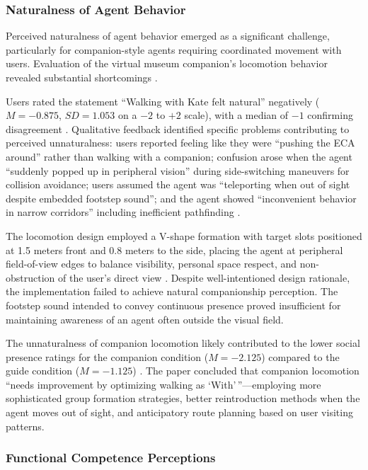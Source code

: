 \documentclass[manuscript,anonymous,sigconf]{acmart}
\begin{document}
\subsubsection{Naturalness of Agent Behavior}

Perceived naturalness of agent behavior emerged as a significant challenge, particularly for companion-style agents requiring coordinated movement with users. Evaluation of the virtual museum companion's locomotion behavior revealed substantial shortcomings \cite{A82}.

Users rated the statement ``Walking with Kate felt natural'' negatively ($M = -0.875$, $SD = 1.053$ on a $-2$ to $+2$ scale), with a median of $-1$ confirming disagreement \cite{A82}. Qualitative feedback identified specific problems contributing to perceived unnaturalness: users reported feeling like they were ``pushing the ECA around'' rather than walking with a companion; confusion arose when the agent ``suddenly popped up in peripheral vision'' during side-switching maneuvers for collision avoidance; users assumed the agent was ``teleporting when out of sight despite embedded footstep sound''; and the agent showed ``inconvenient behavior in narrow corridors'' including inefficient pathfinding \cite{A82}.

The locomotion design employed a V-shape formation with target slots positioned at 1.5 meters front and 0.8 meters to the side, placing the agent at peripheral field-of-view edges to balance visibility, personal space respect, and non-obstruction of the user's direct view \cite{A82}. Despite well-intentioned design rationale, the implementation failed to achieve natural companionship perception. The footstep sound intended to convey continuous presence proved insufficient for maintaining awareness of an agent often outside the visual field.

The unnaturalness of companion locomotion likely contributed to the lower social presence ratings for the companion condition ($M = -2.125$) compared to the guide condition ($M = -1.125$) \cite{A82}. The paper concluded that companion locomotion ``needs improvement by optimizing walking as `With'\,''---employing more sophisticated group formation strategies, better reintroduction methods when the agent moves out of sight, and anticipatory route planning based on user visiting patterns.

\subsubsection{Functional Competence Perceptions}
\end{document}

